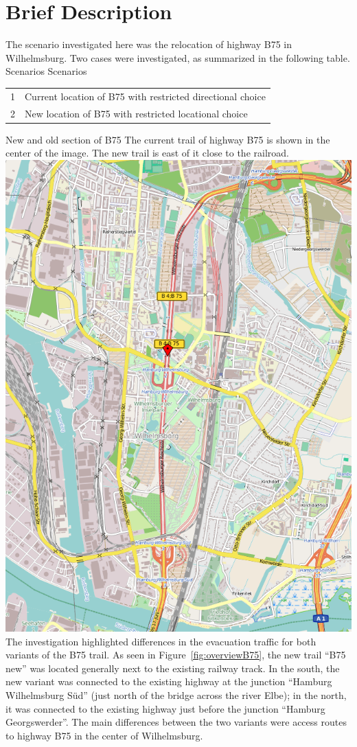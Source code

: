 \section{Brief Description}
The scenario investigated here was the relocation of highway B75 in Wilhelmsburg. Two cases were investigated, as summarized in the following table.
%
\createtable%
	{Scenarios}%
	{Scenarios}%
	{\label{table:b75scenarios}}%
	{%
	\begin{tabular}{|l | l|}
	\hline
	1 & Current location of B75 with restricted directional choice\\
	2 & New location of B75 with restricted locational choice\\
	\hline
\end{tabular}
}%
{}%
%
\createfigure%
	{New and old section of B75}%
	{The current trail of highway B75 is shown in the center of the image. The new trail is east of it close to the railroad.}%
	{\label{fig:overviewB75}}%
	{\includegraphics[width=0.7\linewidth]{scenarios/figures/B75overview}}%
{}
%
The investigation highlighted differences in the evacuation traffic for both variants of the B75 trail. As seen in Figure~\ref{fig:overviewB75}, the new trail ``B75 new'' was located generally next to the existing railway track. In the south, the new variant was connected to the existing highway at the junction ``Hamburg Wilhelmsburg Süd'' (just north of the bridge across the river Elbe); in the north, it was connected to the existing highway just before the junction ``Hamburg Georgswerder''. The main differences between the two variants were access routes to highway B75 in the center of Wilhelmsburg.

